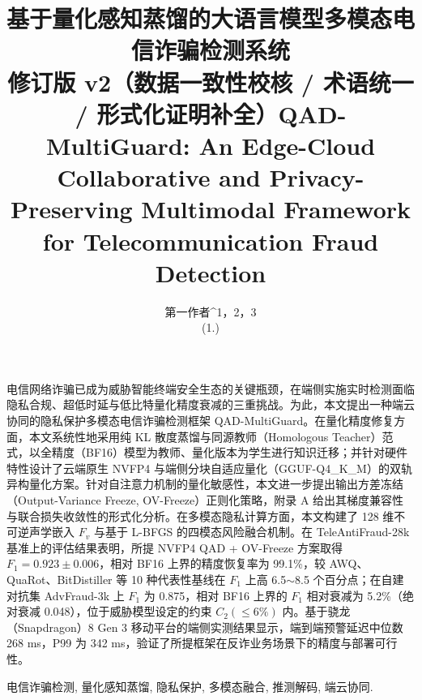 \documentclass[11pt, a4paper]{article}
\title{\textbf{基于量化感知蒸馏的大语言模型多模态电信诈骗检测系统}\\
\large\normalfont 修订版 v2（数据一致性校核 / 术语统一 / 形式化证明补全）}
\author{第一作者^{1}，2，3        \\
\small (1.)}
\date{}
\makeatletter
\newcommand{\makefirstfootnote}{%
    \iffootnoteadded
    \else
        {\footnotetext[1]{基金项目：\@}}%
        {\footnotetext[2]{作者简介：\@authorinfo，通信作者}}%
    \footnoteaddedtrue
    \fi
}
\makeatother
\begin{document}
\maketitle
\makefirstfootnote

\thispagestyle{plain} %

电信网络诈骗已成为威胁智能终端安全生态的关键瓶颈，在端侧实施实时检测面临隐私合规、超低时延与低比特量化精度衰减的三重挑战。为此，本文提出一种端云协同的隐私保护多模态电信诈骗检测框架 QAD-MultiGuard。在量化精度修复方面，本文系统性地采用纯 KL 散度蒸馏与同源教师（Homologous Teacher）范式，以全精度（BF16）模型为教师、量化版本为学生进行知识迁移；并针对硬件特性设计了云端原生 NVFP4 与端侧分块自适应量化（GGUF-Q4\_K\_M）的双轨异构量化方案。针对自注意力机制的量化敏感性，本文进一步提出输出方差冻结（Output-Variance Freeze, OV-Freeze）正则化策略，附录 A 给出其梯度兼容性与联合损失收敛性的形式化分析。在多模态隐私计算方面，本文构建了 128 维不可逆声学嵌入 $F_v$ 与基于 L-BFGS 的四模态风险融合机制。在 TeleAntiFraud-28k 基准上的评估结果表明，所提 NVFP4 QAD + OV-Freeze 方案取得 $F_1=0.923\pm0.006$，相对 BF16 上界的精度恢复率为 99.1\%，较 AWQ、QuaRot、BitDistiller 等 10 种代表性基线在 $F_1$ 上高 6.5$\sim$8.5 个百分点；在自建对抗集 AdvFraud-3k 上 $F_1$ 为 0.875，相对 BF16 上界的 $F_1$ 相对衰减为 5.2\%（绝对衰减 0.048），位于威胁模型设定的约束 $C_2(\le 6\%)$ 内。基于骁龙（Snapdragon）8 Gen 3 移动平台的端侧实测结果显示，端到端预警延迟中位数 268 ms，P99 为 342 ms，验证了所提框架在反诈业务场景下的精度与部署可行性。

 电信诈骗检测, 量化感知蒸馏, 隐私保护, 多模态融合, 推测解码, 端云协同.

\vspace{1em} %

\title{\centering\large\textbf{QAD-MultiGuard: An Edge-Cloud Collaborative and Privacy-Preserving Multimodal Framework for Telecommunication Fraud Detection}}
\end{document}
